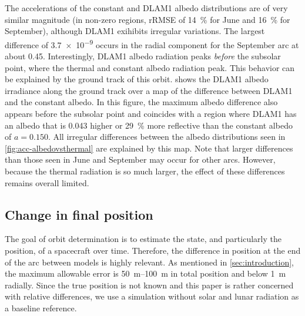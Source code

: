 The accelerations of the constant and \gls{DLAM1} albedo distributions are of very similar magnitude (in non-zero regions, rRMSE of \qty{14}{\percent} for June and \qty{16}{\percent} for September), although \gls{DLAM1} exihibits irregular variations. The largest difference of \qty{3.7e-9}{\acc} occurs in the radial component for the September arc at about 0.45. Interestingly, \gls{DLAM1} albedo radiation peaks \emph{before} the subsolar point, where the thermal and constant albedo radiation peak. This behavior can be explained by the ground track of this orbit.  shows the \gls{DLAM1} albedo irradiance along the ground track over a map of the difference between \gls{DLAM1} and the constant albedo. In this figure, the maximum albedo difference also appears before the subsolar point and coincides with a region where \gls{DLAM1} has an albedo that is \num{0.043} higher or \qty{29}{\percent} more reflective than the constant albedo of $a=0.150$. All irregular differences between the albedo distributions seen in \cref{fig:acc-albedovsthermal} are explained by this map. Note that larger differences than those seen in June and September may occur for other arcs. However, because the thermal radiation is so much larger, the effect of these differences remains overall limited.








\subsection{Change in final position}
The goal of orbit determination is to estimate the state, and particularly the position, of a spacecraft over time. Therefore, the difference in position at the end of the arc between models is highly relevant. As mentioned in \cref{sec:introduction}, the maximum allowable error is \qtyrange{50}{100}{\m} in total position and below \qty{1}{\m} radially. Since the true position is not known and this paper is rather concerned with relative differences, we use a simulation without solar and lunar radiation as a baseline reference.

\begin{table}[tb]
    \caption{Difference of final position in \unit{\m} with respect to the no-\gls{RP} baseline, given as mean over the final orbit plus/minus periodic variations around that mean. The largest changes are in the along-track position. $\mathbf{A}$: solar only; $\mathbf{B}$: lunar only (thermal + constant albedo); $\mathbf{C}$: lunar only (thermal + \gls{DLAM1} albedo); $\mathbf{D}$: solar + lunar (thermal + \gls{DLAM1} albedo).}
    \label{tab:final-position}
    \begin{subtable}[c]{\textwidth}
        
     \end{subtable}

     \medskip

     \begin{subtable}[c]{\textwidth}
        
     \end{subtable}
\end{table}

